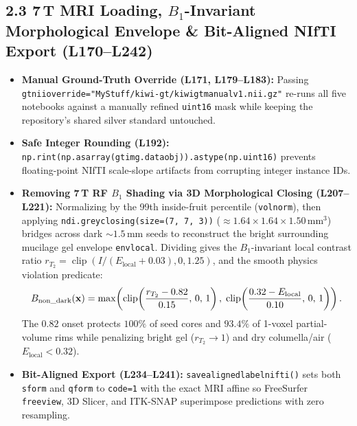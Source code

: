 \documentclass[10pt,a4paper]{article}
\renewcommand{\_}{\origunderscore\allowbreak}
\begin{document}
\subsection*{2.3 7\,T MRI Loading, $B_1$-Invariant Morphological Envelope \& Bit-Aligned NIfTI Export (L170--L242)}
\begin{annotbox}
\begin{itemize}
    \item \textbf{Manual Ground-Truth Override (L171, L179--L183):} Passing \texttt{gt\_nii\_override="MyStuff/kiwi-gt/kiwi\_gt\_manual\_v1.nii.gz"} re-runs all five notebooks against a manually refined \texttt{uint16} mask while keeping the repository's shared silver standard untouched.
    \item \textbf{Safe Integer Rounding (L192):} \texttt{np.rint(np.asarray(gt\_img.dataobj)).astype(np.uint16)} prevents floating-point NIfTI scale-slope artifacts from corrupting integer instance IDs.
    \item \textbf{Removing 7\,T RF $B_1$ Shading via 3D Morphological Closing (L207--L221):} Normalizing by the 99th inside-fruit percentile (\texttt{vol\_norm}), then applying \texttt{ndi.grey\_closing(size=(7, 7, 3))} ($\approx 1.64 \times 1.64 \times 1.50\,\text{mm}^3$) bridges across dark $\sim 1.5\,\text{mm}$ seeds to reconstruct the bright surrounding mucilage gel envelope \texttt{env\_local}. Dividing gives the $B_1$-invariant local contrast ratio $r_{T_2} = \operatorname{clip}(I / (E_{\text{local}} + 0.03), 0, 1.25)$, and the smooth physics violation predicate:
    \[
        B_{\text{non\_dark}}(\mathbf{x}) = \max\!\left(\operatorname{clip}\!\left(\frac{r_{T_2} - 0.82}{0.15},\, 0,\, 1\right),\; \operatorname{clip}\!\left(\frac{0.32 - E_{\text{local}}}{0.10},\, 0,\, 1\right)\right).
    \]
    The $0.82$ onset protects $100\%$ of seed cores and $93.4\%$ of 1-voxel partial-volume rims while penalizing bright gel ($r_{T_2} \to 1$) and dry columella/air ($E_{\text{local}} < 0.32$).
    \item \textbf{Bit-Aligned Export (L234--L241):} \texttt{save\_aligned\_label\_nifti()} sets both \texttt{sform} and \texttt{qform} to \texttt{code=1} with the exact MRI affine so FreeSurfer \texttt{freeview}, 3D Slicer, and ITK-SNAP superimpose predictions with zero resampling.
\end{itemize}
\end{annotbox}
\end{document}
